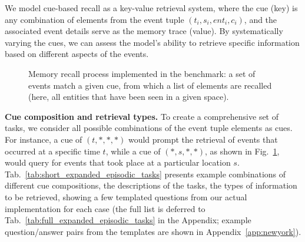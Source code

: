 \documentclass{article}
\begin{document}
We model cue-based recall as a key-value retrieval system, where the cue (key) is any combination of elements from the event tuple \((t_i, s_i, ent_i, c_i)\), and the associated event details serve as the memory trace (value). By systematically varying the cues, we can assess the model's ability to retrieve specific information based on different aspects of the events.
\begin{figure}[ht]
\centering
{}
\caption{Memory recall process implemented in the benchmark: a set of events match a given cue, from which a list of elements are recalled (here, all entities that have been seen in a given space).}\label{fig:tikz}
\end{figure}

\noindent \textbf{Cue composition and retrieval types.}
To create a comprehensive set of tasks, we consider all possible combinations of the event tuple elements as cues. For instance, a cue of $(t, *, *, *)$ would prompt the retrieval of events that occurred at a specific time $t$, while a cue of $(*, s, *, *) $,  as shown in Fig.~\ref{fig:tikz}, would query for events that took place at a particular location $s$.
Tab.~\ref{tab:short_expanded_episodic_tasks} presents example combinations of different cue compositions, the descriptions of the tasks, the types of information to be retrieved, showing a few templated questions from our actual implementation for each case (the full list is deferred to Tab.~\ref{tab:full_expanded_episodic_tasks} in the Appendix; example question/answer pairs from the templates are shown in Appendix~\ref{app:newyork}).


\end{document}
